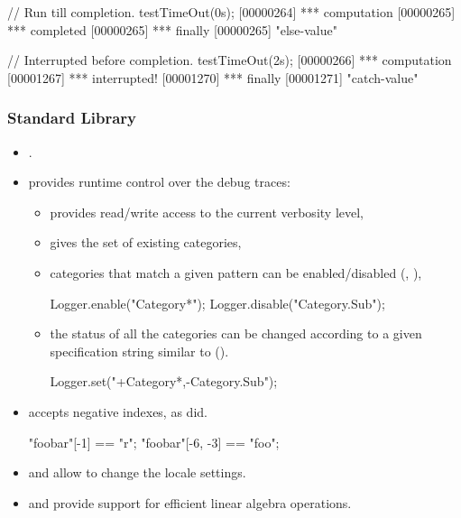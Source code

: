 \begin{itemize}
\begin{urbiscript}
// Run till completion.
testTimeOut(0s);
[00000264] *** computation
[00000265] *** completed
[00000265] *** finally
[00000265] "else-value"

// Interrupted before completion.
testTimeOut(2s);
[00000266] *** computation
[00001267] *** interrupted!
[00001270] *** finally
[00001271] "catch-value"
\end{urbiscript}
\end{itemize}

\subsubsection{\us Standard Library}
\begin{itemize}
\item {}.

\item {} provides runtime control over the debug traces:
  \begin{itemize}
  \item {} provides read/write access to the current
    verbosity level,
  \item {} gives the set of existing categories,
  \item categories that match a given pattern can be enabled/disabled
    (, ),
\begin{urbiscript}
Logger.enable("Category*");
Logger.disable("Category.Sub");
\end{urbiscript}
  \item the status of all the categories can be changed according to a given
    specification string similar to 
    ().
\begin{urbiscript}
Logger.set("+Category*,-Category.Sub");
\end{urbiscript}
  \end{itemize}

\item {} accepts negative indexes, as
   did.
\begin{urbiassert}
"foobar"[-1] == "r";    "foobar"[-6, -3] == "foo";
\end{urbiassert}

\item {} and  allow to
  change the locale settings.

\item {} and  provide support for
  efficient linear algebra operations.
\end{itemize}

